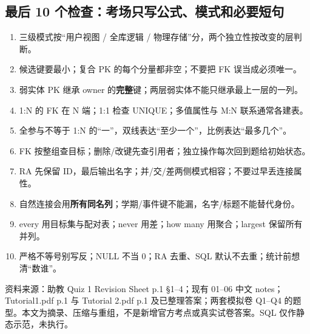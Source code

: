 \documentclass[11pt,a4paper]{article}
\begin{document}
\subsection{最后 10 个检查：考场只写公式、模式和必要短句}
\begin{enumerate}[itemsep=1pt,topsep=2pt]
\item 三级模式按“用户视图 / 全库逻辑 / 物理存储”分，两个独立性按改变的层判断。
\item 候选键要最小；复合 PK 的每个分量都非空；不要把 FK 误当成必须唯一。
\item 弱实体 PK 继承 owner 的\textbf{完整}键；两层弱实体不能只继承最上一层的一列。
\item 1:N 的 FK 在 N 端；1:1 检查 UNIQUE；多值属性与 M:N 联系通常各建表。
\item 全参与不等于 1:N 的“一”，双线表达“至少一个”，比例表达“最多几个”。
\item FK 按整组查目标；删除/改键先查引用者；独立操作每次回到题给初始状态。
\item RA 先保留 ID，最后输出名字；并/交/差两侧模式相容；不要过早丢连接属性。
\item 自然连接会用\textbf{所有同名列}；学期/事件键不能漏，名字/标题不能替代身份。
\item every 用目标集与配对表；never 用差；how many 用聚合；largest 保留所有并列。
\item 严格不等号别写反；NULL 不当 0；RA 去重、SQL 默认不去重；统计前想清“数谁”。
\end{enumerate}
{\footnotesize\color{Muted}资料来源：助教 Quiz 1 Revision Sheet p.1 §1--4；现有 01--06 中文 notes；Tutorial1.pdf p.1 与 Tutorial 2.pdf p.1 及已整理答案；两套模拟卷 Q1--Q4 的题型。本文为摘录、压缩与重组，不是新增官方考点或真实试卷答案。SQL 仅作静态示范，未执行。}
\end{document}
